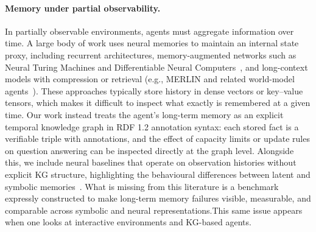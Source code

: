 \documentclass[Afour,sageh,times]{sagej}
\begin{document}
\paragraph{Memory under partial observability.}
In partially observable environments, agents must aggregate information over time. A
large body of work uses neural memories to maintain an internal state proxy, including
recurrent architectures, memory-augmented networks such as Neural Turing Machines and
Differentiable Neural Computers~\citep{graves2014neural,graves2016hybrid}, and
long-context models with compression or retrieval (e.g., MERLIN and related world-model
agents~\citep{Wayne2018MERLIN,DBLP:journals/corr/abs-1803-10122}). These approaches
typically store history in dense vectors or key--value tensors, which makes it difficult
to inspect what exactly is remembered at a given time. Our work instead treats the
agent’s long-term memory as an explicit temporal knowledge graph in RDF 1.2 annotation
syntax: each stored fact is a verifiable triple with annotations, and the effect of capacity limits or
update rules on question answering can be inspected directly at the graph level.
Alongside this, we include neural baselines that operate on observation histories
without explicit KG structure, highlighting the behavioural differences between latent
and symbolic memories~\citep{kimura2021neurosymbolicreinforcementlearningfirstorder}.
What is missing from this literature is a benchmark expressly constructed to make
long-term memory failures visible, measurable, and comparable across symbolic and neural
representations.This same issue appears when one looks at interactive environments and KG-based agents.
\end{document}
